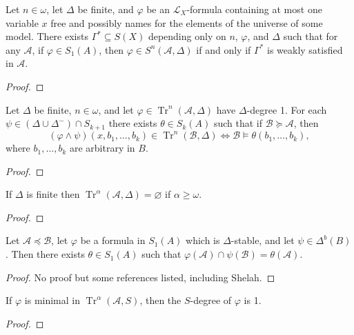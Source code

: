 \documentclass{article}
\DeclareMathOperator{\Tr}{Tr}
\let\mc\mathcal
\begin{document}
\begin{lemma}\label{dFinite}
    Let $n \in \omega$, let $\Delta$ be finite, and $\varphi$ be an $\mc{L}_X$-formula containing at most one variable $x$ free and possibly names for the elements of the universe of some model. There exists $\Gamma^{*} \subseteq S(X)$ depending only on $n$, $\varphi$, and $\Delta$ such that for any $\mc{A}$, if $\varphi \in S_1(A)$, then $\varphi \in S^n(\mc{A}, \Delta)$ if and only if $\Gamma^{*}$ is weakly satisfied in $\mc{A}$.
\end{lemma}
\begin{proof}
\end{proof}

\begin{lemma}
    Let $\Delta$ be finite, $n \in \omega$, and let $\varphi \in \Tr^{n}(\mc{A}, \Delta)$ have $\Delta$-degree 1. For each $\psi \in (\Delta \cup \Delta^{-}) \cap S_{k+1}$ there exists $\theta \in S_k(A)$ such that if $\mc{B} \succeq \mc{A}$, then 
    \[ (\varphi \land \psi)(x, b_1, \ldots, b_k) \in \Tr^{n}(\mc{B}, \Delta) \Leftrightarrow \mc{B} \vDash \theta(b_1, \ldots, b_k), \]
    where $b_1, \ldots, b_k$ are arbitrary in $B$.
\end{lemma}
\begin{proof}
\end{proof}

\begin{lemma}
    If $\Delta$ is finite then $\Tr^{\alpha}(\mc{A}, \Delta) = \varnothing$ if $\alpha \geq \omega$.
\end{lemma}
\begin{proof}
\end{proof}

\begin{definition}
\end{definition}

\begin{lemma}
    Let $\mc{A} \preceq \mc{B}$, let $\varphi$ be a formula in $S_1(A)$ which is $\Delta$-stable, and let $\psi \in \Delta^b(B)$. Then there exists $\theta \in S_1(A)$ such that $\varphi(\mc{A}) \cap \psi(\mc{B}) = \theta(\mc{A})$.
\end{lemma}
\begin{proof}
    No proof but some references listed, including Shelah.
\end{proof}

\begin{lemma}
    If $\varphi$ is minimal in $\Tr^{\alpha}(\mc{A}, S)$, then the $S$-degree of $\varphi$ is 1.
\end{lemma}
\begin{proof}
\end{proof}
\end{document}
